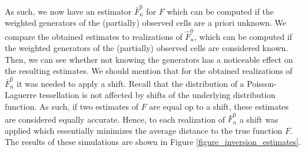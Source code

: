 \documentclass{article}
\theoremstyle{plain}
\theoremstyle{remark}
\theoremstyle{definition}
\begin{document}
As such, we now have an estimator $\bar{F}_n^0$ for $F$ which can be computed if the weighted generators of the (partially) observed cells are a priori unknown. We compare the obtained estimates to realizations of $\hat{F}_n^0$, which can be computed if the weighted generators of the (partially) observed cells are considered known. Then, we can see whether not knowing the generators has a noticeable effect on the resulting estimates. We should mention that for the obtained realizations of $\bar{F}_n^0$ it was needed to apply a shift. Recall that the distribution of a Poisson-Laguerre tessellation is not affected by shifts of the underlying distribution function. As such, if two estimates of $F$ are equal op to a shift, these estimates are considered equally accurate. Hence, to each realization of $\bar{F}_n^0$ a shift was applied which essentially minimizes the average distance to the true function $F$. The results of these simulations are shown in Figure \ref{figure_inversion_estimates}. 
\end{document}
